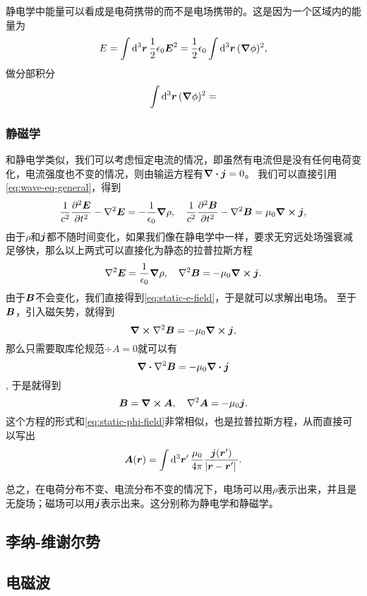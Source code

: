 \documentclass[UTF8, a4paper]{ctexart}
\begin{document}
静电学中能量可以看成是电荷携带的而不是电场携带的。这是因为一个区域内的能量为
\[
    E = \int \dd[3]{\vb*{r}} \frac{1}{2} \epsilon_0 \vb*{E}^2 = \frac{1}{2} \epsilon_0 \int \dd[3]{\vb*{r}} (\grad{\phi})^2,
\]
做分部积分
\[
    \int \dd[3]{\vb*{r}} (\grad{\phi})^2 = 
\]

\subsubsection{静磁学}

和静电学类似，我们可以考虑恒定电流的情况，即虽然有电流但是没有任何电荷变化，电流强度也不变的情况，则由输运方程有$\div{\vb*{j}}=0$。
我们可以直接引用\eqref{eq:wave-eq-general}，得到
\[
    \frac{1}{c^2} \pdv[2]{\vb*{E}}{t} - \laplacian{\vb*{E}} = - \frac{1}{\epsilon_0} \grad{\rho} , \quad \frac{1}{c^2} \pdv[2]{\vb*{B}}{t} - \laplacian{\vb*{B}} = \mu_0 \curl{\vb*{j}},
\]
由于$\rho$和$\vb*{j}$都不随时间变化，如果我们像在静电学中一样，要求无穷远处场强衰减足够快，那么以上两式可以直接化为静态的拉普拉斯方程
\[
    \laplacian{\vb*{E}} = \frac{1}{\epsilon_0} \grad{\rho}, \quad \laplacian{\vb*{B}} = - \mu_0 \curl{\vb*{j}}.
\]
由于$\vb*{B}$不会变化，我们直接得到\eqref{eq:static-e-field}，于是就可以求解出电场。
至于$\vb*{B}$，引入磁矢势，就得到
\[
    \curl{\laplacian{\vb*{B}}} = - \mu_0 \curl{\vb*{j}},
\]
那么只需要取库伦规范$\div{A}=0$就可以有
\[
    \div{\laplacian{\vb*{B}}} = - \mu_0 \div{\vb*{j}}
\],
于是就得到
\begin{equation}
    \vb*{B} = \curl{\vb*{A}}, \quad \laplacian{\vb*{A}} = - \mu_0 \vb*{j}.
\end{equation}
这个方程的形式和\eqref{eq:static-phi-field}非常相似，也是拉普拉斯方程，从而直接可以写出
\begin{equation}
    \vb*{A}(\vb*{r}) = \int \dd[3]{\vb*{r}'} \frac{\mu_0}{4\pi} \frac{\vb*{j}(\vb*{r}')}{\abs*{\vb*{r} - \vb*{r}'}}.
    \label{eq:from-j-to-a}
\end{equation}

总之，在电荷分布不变、电流分布不变的情况下，电场可以用$\rho$表示出来，并且是无旋场；磁场可以用$\vb*{j}$表示出来。这分别称为静电学和静磁学。

\subsection{李纳-维谢尔势}

\subsection{电磁波}
\end{document}
